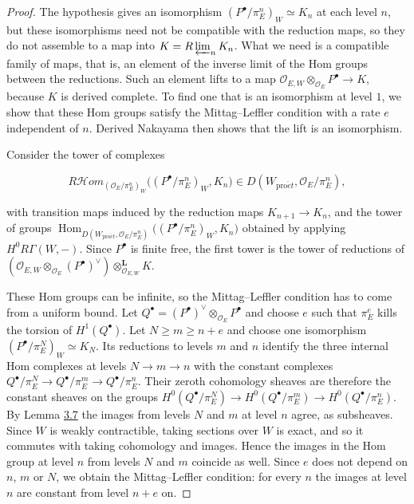 \documentclass[11pt]{article}
\providecommand{\Hom}{}\renewcommand{\Hom}{\operatorname{Hom}}
\providecommand{\cHom}{}\renewcommand{\cHom}{R\mathcal{H}\!om}
\begin{document}
\begin{proof}[{Proof}]\label{bp30}%
The hypothesis gives an isomorphism \((P^\bullet/\pi_E^n)_W\simeq K_n\) at each level \(n\), but these isomorphisms need not be compatible with the reduction maps, so they do not assemble to a map into \(K=R\varprojlim_nK_n\). What we need is a compatible family of maps, that is, an element of the inverse limit of the Hom groups between the reductions. Such an element lifts to a map \(\mathcal O_{E,W}\otimes_{\mathcal O_E}P^\bullet\to K\), because \(K\) is derived complete. To find one that is an isomorphism at level \(1\), we show that these Hom groups satisfy the Mittag–Leffler condition with a rate \(e\) independent of \(n\). Derived Nakayama then shows that the lift is an isomorphism.

Consider the tower of complexes

\[
\cHom_{(\mathcal O_E/\pi_E^n)_W}\bigl((P^\bullet/\pi_E^n)_W,K_n\bigr)
\in D(W_{\mathrm{pro}\acute{e}t},\mathcal O_E/\pi_E^n),
\]

with transition maps induced by the reduction maps \(K_{n+1}\to K_n\), and the tower of groups \(\Hom_{D(W_{\mathrm{pro}\acute{e}t},\mathcal O_E/\pi_E^n)}\bigl((P^\bullet/\pi_E^n)_W,K_n\bigr)\) obtained by applying \(H^0R\Gamma(W,-)\). Since \(P^\bullet\) is finite free, the first tower is the tower of reductions of \((\mathcal O_{E,W}\otimes_{\mathcal O_E}(P^\bullet)^\vee)\otimes^{\mathbf L}_{\mathcal O_{E,W}}K\).

These Hom groups can be infinite, so the Mittag–Leffler condition has to come from a uniform bound. Let \(Q^\bullet=(P^\bullet)^\vee\otimes_{\mathcal O_E}P^\bullet\) and choose \(e\) such that \(\pi_E^e\) kills the torsion of \(H^1(Q^\bullet)\). Let \(N\ge m\ge n+e\) and choose one isomorphism \((P^\bullet/\pi_E^N)_W\simeq K_N\). Its reductions to levels \(m\) and \(n\) identify the three internal Hom complexes at levels \(N\to m\to n\) with the constant complexes \(Q^\bullet/\pi_E^N\to Q^\bullet/\pi_E^m\to Q^\bullet/\pi_E^n\). Their zeroth cohomology sheaves are therefore the constant sheaves on the groups \(H^0(Q^\bullet/\pi_E^N)\to H^0(Q^\bullet/\pi_E^m)\to H^0(Q^\bullet/\pi_E^n)\). By Lemma \hyperref[bp22]{3.7} the images from levels \(N\) and \(m\) at level \(n\) agree, as subsheaves. Since \(W\) is weakly contractible, taking sections over \(W\) is exact, and so it commutes with taking cohomology and images. Hence the images in the Hom group at level \(n\) from levels \(N\) and \(m\) coincide as well. Since \(e\) does not depend on \(n\), \(m\) or \(N\), we obtain the Mittag–Leffler condition: for every \(n\) the images at level \(n\) are constant from level \(n+e\) on.


\end{proof}
\end{document}
